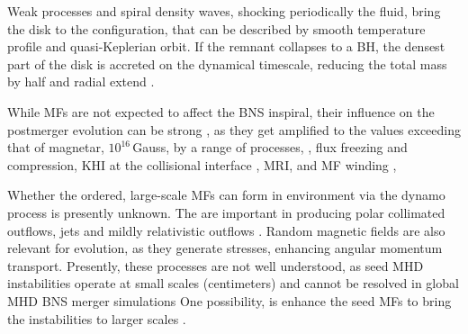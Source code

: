 Weak processes and spiral density waves, shocking periodically the fluid, 
bring the disk to the configuration, that can be described by smooth 
temperature profile 
and quasi-Keplerian orbit.
%
If the remnant collapses to a \ac{BH}, the densest part of the disk is 
accreted on the dynamical timescale, reducing the total mass by half 
and radial extend \cite{Perego:2019adq}.

While \acp{MF} are not expected to affect the \ac{BNS} inspiral, their influence 
on the postmerger evolution can be strong \cite{Duez:2006qe,Kiuchi:2017zzg}, as they get amplified 
to the values exceeding that of magnetar, $10^{16}\,$Gauss, by a range of processes, 
\eg, flux freezing and compression, \ac{KHI} at the collisional interface \cite{Kiuchi:2015sga},
\ac{MRI}, \cite{Duez:2006qe,Kiuchi:2017zzg} and \ac{MF} winding \cite{Duez:2006qe},
%

Whether the ordered, large-scale \acp{MF} can form in \pmerg{} environment 
via the dynamo process is presently unknown. The are important in producing 
polar collimated outflows, jets \cite{Bucciantini:2011kx,Ruiz:2016rai} and mildly relativistic outflows
\cite{Metzger:2018qfl,Fernandez:2018kax}. Random magnetic fields are also relevant for \pmerg{} evolution, 
as they generate stresses, enhancing angular momentum transport. Presently, 
these processes are not well understood, as seed \ac{MHD} instabilities operate at 
small scales (centimeters) and cannot be resolved in global \ac{MHD} \ac{BNS} merger 
simulations
One possibility, is enhance the seed \acp{MF} to bring the instabilities to larger 
scales \cite{Kiuchi:2015sga,Kiuchi:2017zzg}.

